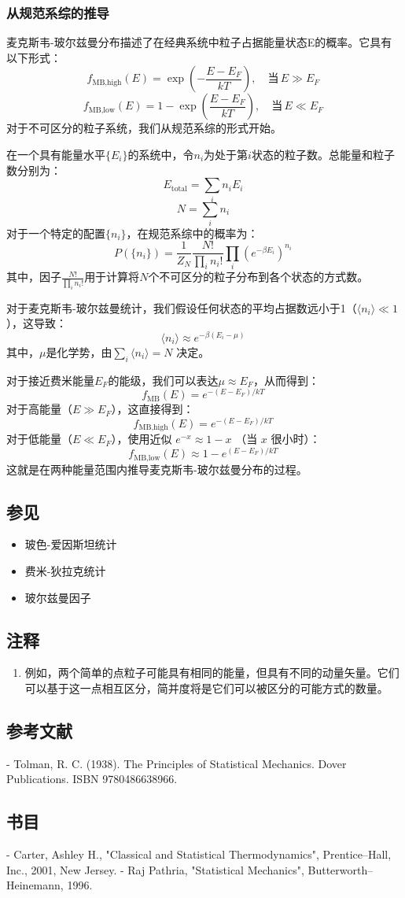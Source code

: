 \subsubsection{从规范系综的推导}
麦克斯韦-玻尔兹曼分布描述了在经典系统中粒子占据能量状态E的概率。它具有以下形式：
\[
f_{\text{MB,high}}(E) = \exp \left( -\frac{E - E_F}{kT} \right), \quad \text{当} \, E \gg E_F~
\]
\[
f_{\text{MB,low}}(E) = 1 - \exp \left( \frac{E - E_F}{kT} \right), \quad \text{当} \, E \ll E_F~
\]
对于不可区分的粒子系统，我们从规范系综的形式开始。

在一个具有能量水平\(\{E_i\}\)的系统中，令\(n_i\)为处于第\(i\)状态的粒子数。总能量和粒子数分别为：
\[
E_{\text{total}} = \sum_i n_i E_i~
\]
\[
N = \sum_i n_i~
\]
对于一个特定的配置\(\{n_i\}\)，在规范系综中的概率为：
\[
P(\{n_i\}) = \frac{1}{Z_N} \frac{N!}{\prod_i n_i!} \prod_i (e^{-\beta E_i})^{n_i}~
\]
其中，因子\(\frac{N!}{\prod_i n_i!}\)用于计算将\(N\)个不可区分的粒子分布到各个状态的方式数。

对于麦克斯韦-玻尔兹曼统计，我们假设任何状态的平均占据数远小于1（\(\langle n_i \rangle \ll 1\)），这导致：
\[
\langle n_i \rangle \approx e^{-\beta (E_i - \mu)}~
\]
其中，\(\mu\)是化学势，由\(\sum_i \langle n_i \rangle = N\) 决定。

对于接近费米能量\(E_F\)的能级，我们可以表达\(\mu \approx E_F\)，从而得到：
\[
f_{\text{MB}}(E) = e^{-(E - E_F) / kT}~
\]
对于高能量（\(E \gg E_F\)），这直接得到：
\[
f_{\text{MB,high}}(E) = e^{-(E - E_F) / kT}~
\]
对于低能量（\(E \ll E_F\)），使用近似 \(e^{-x} \approx 1 - x\) （当 \(x\) 很小时）：
\[
f_{\text{MB,low}}(E) \approx 1 - e^{(E - E_F) / kT}~
\]
这就是在两种能量范围内推导麦克斯韦-玻尔兹曼分布的过程。
\subsection{参见}
\begin{itemize}
\item 玻色-爱因斯坦统计
\item 费米-狄拉克统计
\item 玻尔兹曼因子
\end{itemize}

\subsection{注释}
\begin{enumerate}
\item 例如，两个简单的点粒子可能具有相同的能量，但具有不同的动量矢量。它们可以基于这一点相互区分，简并度将是它们可以被区分的可能方式的数量。
\end{enumerate}

\subsection{参考文献}
- Tolman, R. C. (1938). The Principles of Statistical Mechanics. Dover Publications. ISBN 9780486638966.

\subsection{书目}
- Carter, Ashley H., "Classical and Statistical Thermodynamics", Prentice–Hall, Inc., 2001, New Jersey.
- Raj Pathria, "Statistical Mechanics", Butterworth–Heinemann, 1996.